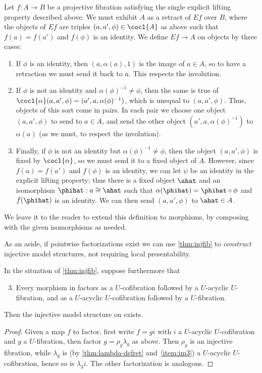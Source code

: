 \begin{verbose}
\begin{eg}
  Let $f:A\to B$ be a projective fibration satisfying the single explicit lifting property described above.
  We must exhibit $A$ as a retract of $E f$ over $B$, where the objects of $E f$ are triples $(a,a',\phi) \in \cocl{A}$ as above such that $f(a)=f(a')$ and $f(\phi)$ is an identity.
  We define $E f \to A$ on objects by three cases:
  \begin{enumerate}
  \item If $\phi$ is an identity, then $(a,\alpha(a),1)$ is the image of $a\in A$, so to have a retraction we must send it back to $a$.
    This respects the involution.
  \item If $\phi$ is not an identity and $\alpha(\phi)^{-1} \neq \phi$, then the same is true of $\cocl{\alpha}(a,a',\phi) = (a',a,\alpha(\phi)^{-1})$, which is unequal to $(a,a',\phi)$.
    Thus, objects of this sort come in pairs.
    In each pair we choose one object $(a,a',\phi)$ to send to $a\in A$, and send the other object $(a',a,\alpha(\phi)^{-1})$ to $\alpha(a)$ (as we must, to respect the involution).
  \item Finally, if $\phi$ is not an identity but $\alpha(\phi)^{-1} \neq \phi$, then the object $(a,a',\phi)$ is fixed by $\cocl{\alpha}$, so we must send it to a fixed object of $A$.
    However, since $f(a)=f(a')$ and $f(\phi)$ is an identity, we can let $\psi$ be an identity in the explicit lifting property; thus there is a fixed object $\ahat$ and an isomorphism $\phihat:a\cong \ahat$ such that $\alpha(\phihat) = \phihat\circ \phi$ and $f(\phihat)$ is an identity.
    We can then send $(a,a',\phi)$ to $\ahat\in A$.
  \end{enumerate}
  We leave it to the reader to extend this definition to morphisms, by composing with the given isomorphisms as needed.
\end{eg}
\end{verbose}

As an aside, if pointwise factorizations exist we can use \cref{thm:injfib} to \emph{construct} injective model structures, not requiring local presentability.

\begin{cor}\label{thm:injmodel}
  In the situation of \cref{thm:injfib}, suppose furthermore that
  \begin{enumerate}\setcounter{enumi}{2}
  \item Every morphism in \M factors as a $U$-cofibration followed by a $U$-acyclic $U$-fibration, and as a $U$-acyclic $U$-cofibration followed by a $U$-fibration.\label{item:im2}
  \end{enumerate}
  Then the injective model structure on \M exists.
\end{cor}
\begin{proof}
  Given a map $f$ to factor, first write $f = g i$ with $i$ a $U$-acyclic $U$-cofibration and $g$ a $U$-fibration, then factor $g = \rho_g \lambda_g$ as above.
  Then $\rho_g$ is an injective fibration, while $\lambda_g$ is (by \cref{thm:lambda-defret} and~\ref{item:im3}) a $U$-acyclic $U$-cofibration, hence so is $\lambda_g i$.
  The other factorization is analogous.
\end{proof}

